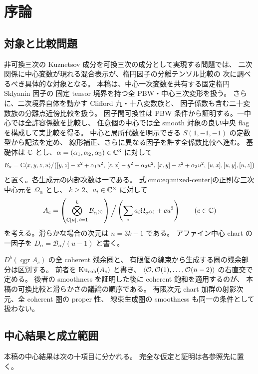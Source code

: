 \section{序論}
\label{mix:sec:introduction}

\subsection{対象と比較問題}

非可換三次の Kuznetsov 成分を可換三次の成分として実現する問題では、
二次関係に中心変数が現れる混合表示が、楕円因子の分離テンソル比較の
次に調べるべき具体的な対象となる。
本稿は、中心一次変数を共有する固定楕円 Sklyanin 因子の
固定 tensor 境界を持つ全 PBW・中心三次変形を扱う。
さらに、二次境界自体を動かす Clifford 九・十八変数族と、
因子係数も含む二十変数族の分離点近傍比較を扱う。
因子間可換性は PBW 条件から証明する。一中心では全許容係数を比較し、
任意個の中心では全 smooth 対象の良い中央 flag を構成して実比較を得る。
中心と局所代数を明示できる $S(1,-1,-1)$ の定数型から記法を定め、
線形補正、さらに異なる因子を許す全係数比較へ進む。
基礎体は $\mathbb C$ とし、$\alpha=(\alpha_1,\alpha_2,\alpha_3)\in\mathbb C^3$ に対して
\[
 \mathcal B_\alpha
 =\mathbb C\langle x,y,z,u\rangle/
 \bigl([y,z]-x^2+\alpha_1u^2,\,
       [z,x]-y^2+\alpha_2u^2,\,
       [x,y]-z^2+\alpha_3u^2,\,
       [u,x],[u,y],[u,z]\bigr)
\]
と置く。各生成元の内部次数は一である。
式\eqref{cmo:eq:mixed-center}の正則な三次中心元を $\Omega_\alpha$ とし、
$k\ge2$、$a_i\in\mathbb C^\times$ に対して
\[
 A_c=
 \left(\bigotimes_{\mathbb C[u],\,i=1}^k\mathcal B_{\alpha^{(i)}}\right)
 \Big/\left(\sum_i a_i\Omega_{\alpha^{(i)}}+cu^3\right)
 \qquad(c\in\mathbb C)
\]
を考える。滑らかな場合の次元は $n=3k-1$ である。
アファイン中心 chart の一因子を
$D_\alpha=\mathcal B_\alpha/(u-1)$ と書く。

$D^b(\operatorname{qgr}A_c)$ の全 coherent 残余圏と、
有限個の線束から生成する圏の残余部分は区別する。
前者を $\operatorname{Ku}_{\mathrm{coh}}(A_c)$ と書き、
$\langle\mathcal O,\mathcal O(1),\ldots,\mathcal O(n-2)\rangle$ の右直交で定める。
後者の smoothness を証明した後に coherent 飽和を適用するのが、
本稿の可換比較と滑らかさの議論の順序である。
有限次元 chart 加群の射影次元、全 coherent 圏の proper 性、
線束生成圏の smoothness も同一の条件として扱わない。

\subsection{中心結果と成立範囲}

本稿の中心結果は次の十項目に分かれる。
完全な仮定と証明は各参照先に置く。


